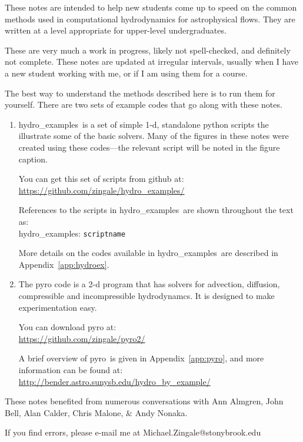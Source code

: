 \documentclass[11pt]{book}
\newcommand{\pyro}{{\sf pyro}}
\newcommand{\hydroex}{{\sf hydro\_examples}}
\newcommand{\hydroexdoit}[1]{{\color{red} \LARGE \Keyboard}\/ \hydroex: {\tt #1}}
\begin{document}
These notes are intended to help new students come up to speed on the
common methods used in computational hydrodynamics for astrophysical
flows.  They are written at a level appropriate for upper-level
undergraduates.

These are very much a work in progress, likely not spell-checked, and 
definitely not complete.  These notes are updated at irregular
intervals, usually when I have a new student working with me, or if
I am using them for a course.

The best way to understand the methods described here is to run
them for yourself.  There are two sets of example codes that
go along with these notes.

\begin{enumerate}
\item \hydroex\ is a set of simple 1-d, standalone python scripts
  the illustrate some of the basic solvers.  Many of the figures
  in these notes were created using these codes---the relevant
  script will be noted in the figure caption.  

  You can get this set of scripts from github at:\\
  \url{https://github.com/zingale/hydro_examples/}

  References to the scripts in \hydroex\ are shown throughout
  the text as: \\[0.5em]
  \hydroexdoit{scriptname}

  More details on the codes available in \hydroex\ are described
  in Appendix~\ref{app:hydroex}.

\item  The {\sf pyro} code is a 2-d program that has
  solvers for advection, diffusion, compressible and incompressible
  hydrodynamcs.  It is designed to make 
  experimentation easy.  

  You can download {\sf pyro} at: \\
  \url{https://github.com/zingale/pyro2/} 

  A brief overview of \pyro\ is given in Appendix~\ref{app:pyro},
  and more information can be found at: \\
\url{http://bender.astro.sunysb.edu/hydro_by_example/}
\end{enumerate}

These notes benefited from numerous conversations with Ann Almgren,
John Bell, Alan Calder, Chris Malone, \& Andy Nonaka.

If you find errors, please e-mail me at Michael.Zingale@stonybrook.edu
\end{document}
